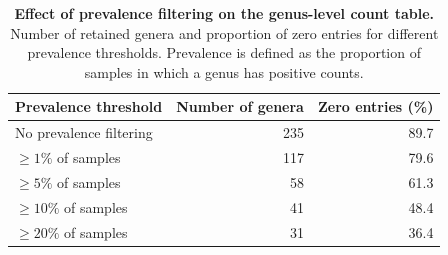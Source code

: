 \begin{table}

\caption{\label{tab:unnamed-chunk-9}\textbf{Effect of prevalence filtering on the genus-level count table.} Number of retained genera and proportion of zero entries for different prevalence thresholds. Prevalence is defined as the proportion of samples in which a genus has positive counts.}
\centering
\begin{tabular}[t]{lrr}
\toprule
Prevalence threshold & Number of genera & Zero entries (\%)\\
\midrule
No prevalence filtering & 235 & 89.7\\
$\geq 1\%$ of samples & 117 & 79.6\\
$\geq 5\%$ of samples & 58 & 61.3\\
$\geq 10\%$ of samples & 41 & 48.4\\
$\geq 20\%$ of samples & 31 & 36.4\\
\bottomrule
\end{tabular}
\end{table}
